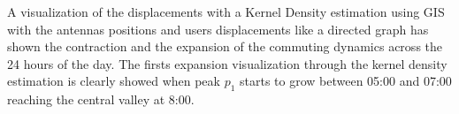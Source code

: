 A visualization of the displacements with a Kernel Density estimation using GIS with the antennas positions and users displacements like a directed graph has shown the contraction and the expansion of the commuting dynamics across the 24 hours of the day. The firsts expansion visualization through the kernel density estimation is clearly showed when peak $p_1$ starts to grow between 05:00 and 07:00 reaching the central valley at 8:00.

\newpage

\begin{figure}
\centering
{}
\end{figure}
